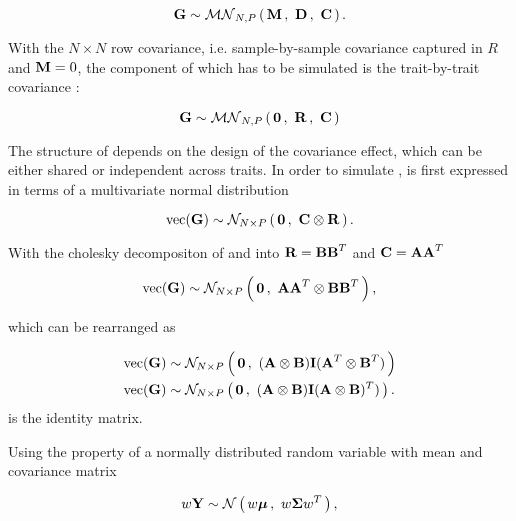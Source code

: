 \begin{enumerate}
\begin{equation}
\boldsymbol{\mathbf{G}} \sim \mathcal{MN}_{N,P}\left(\, \boldsymbol{\mathbf{{M}}} \,,~\boldsymbol{\mathbf{{D}}}\,,~\boldsymbol{\mathbf{{C}}} \,\right).
\end{equation}

With the \(N \times N\)  row covariance, i.e. sample-by-sample covariance captured in \(R\) and  \(\boldsymbol{\mathbf{M}}=0\), the  component of  which has to be simulated is the trait-by-trait covariance :

\begin{equation}
\mat{G} \sim  \matrixnormal N P 0 R C
\label{eq:G-mvn}
\end{equation}

The structure of  depends on the design of the covariance effect, which can be either shared or independent across traits. In order to simulate ,  is first expressed in terms of a multivariate normal distribution 

\begin{equation}
\text{vec}(\boldsymbol{\mathbf{G}}) \sim \mathcal{N}_{N\times P}\left(\, {\boldsymbol{\mathbf{0}}} \,,~{\boldsymbol{\mathbf{C}} \otimes \boldsymbol{\mathbf{R}}} \,\right).
\end{equation}

With the cholesky decompositon of  and  into  \(\boldsymbol{\mathbf{R}}=\boldsymbol{\mathbf{BB}}^T\) and \(\boldsymbol{\mathbf{C}}=\boldsymbol{\mathbf{AA}}^T\) 

\begin{equation}
\text{vec}(\boldsymbol{\mathbf{G}}) \sim \mathcal{N}_{N\times P}\left(\, {\boldsymbol{\mathbf{0}}} \,,~{\boldsymbol{\mathbf{AA}}^T  \otimes \boldsymbol{\mathbf{BB}}^T} \,\right),  
\end{equation}

which can be rearranged as 

\begin{equation}
\begin{aligned}
\text{vec}(\boldsymbol{\mathbf{G}}) & \sim \mathcal{N}_{N\times P}\left(\, {\boldsymbol{\mathbf{0}}} \,,~{(\boldsymbol{\mathbf{A}} \otimes \boldsymbol{\mathbf{B}}) \boldsymbol{\mathbf{I}} (\boldsymbol{\mathbf{A}}^T \otimes \boldsymbol{\mathbf{B}}^T)} \,\right) \\
\text{vec}(\boldsymbol{\mathbf{G}}) & \sim \mathcal{N}_{N\times P}\left(\, {\boldsymbol{\mathbf{0}}} \,,~{(\boldsymbol{\mathbf{A }}\otimes \boldsymbol{\mathbf{B}}) \boldsymbol{\mathbf{I}} (\boldsymbol{\mathbf{A}} \otimes\boldsymbol{\mathbf{B}})^T)} \,\right). 
\end{aligned}
\end{equation}
 is the identity matrix.
 
Using the property of a normally distributed random variable  with mean \tmat{\mu} and covariance matrix \tmat{\Sigma}

\begin{equation}
\begin{aligned} 
w \boldsymbol{\mathbf{Y}} \sim \mathcal{N}\left(\,{w\boldsymbol{\mathbf{\mu}}}\,,~{w\boldsymbol{\mathbf{\Sigma}} w^T}\,\right),
\end{aligned}
\end{equation}


\end{enumerate}
